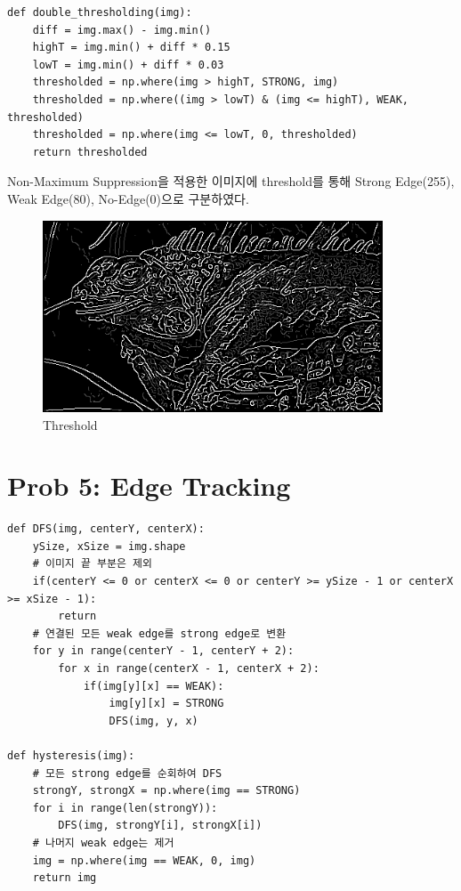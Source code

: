 \documentclass[]{report}
\begin{document}
\begin{lstlisting}
def double_thresholding(img):
	diff = img.max() - img.min()
	highT = img.min() + diff * 0.15
	lowT = img.min() + diff * 0.03
	thresholded = np.where(img > highT, STRONG, img)
	thresholded = np.where((img > lowT) & (img <= highT), WEAK, thresholded)
	thresholded = np.where(img <= lowT, 0, thresholded)
	return thresholded
\end{lstlisting}

Non-Maximum Suppression을 적용한 이미지에 threshold를 통해 Strong Edge(255), Weak Edge(80), No-Edge(0)으로 구분하였다. \\

\begin{figure}[ht!]
	\centering
	\includegraphics[width=0.9\textwidth]{image/problem4.png}
	\caption{Threshold}
	\label{problem4}
\end{figure}


\section*{Prob 5: Edge Tracking}

\begin{lstlisting}
def DFS(img, centerY, centerX):
	ySize, xSize = img.shape
	# 이미지 끝 부분은 제외
	if(centerY <= 0 or centerX <= 0 or centerY >= ySize - 1 or centerX >= xSize - 1):
		return
	# 연결된 모든 weak edge를 strong edge로 변환
	for y in range(centerY - 1, centerY + 2):
		for x in range(centerX - 1, centerX + 2):
			if(img[y][x] == WEAK):
				img[y][x] = STRONG
				DFS(img, y, x)

def hysteresis(img):
	# 모든 strong edge를 순회하여 DFS
	strongY, strongX = np.where(img == STRONG)
	for i in range(len(strongY)):
		DFS(img, strongY[i], strongX[i])
	# 나머지 weak edge는 제거
	img = np.where(img == WEAK, 0, img)
	return img
\end{lstlisting}
\end{document}
